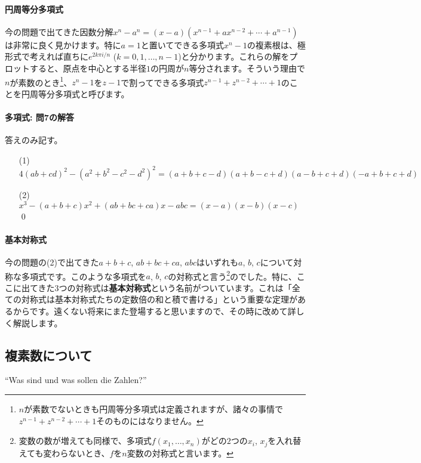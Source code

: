 \paragraph{円周等分多項式} 今の問題で出てきた因数分解$x^n-a^n=(x-a)(x^{n-1}+ax^{n-2}+\cdots+a^{n-1})$は非常に良く見かけます。特に$a=1$と置いてできる多項式$x^n-1$の複素根は、極形式で考えれば直ちに$e^{2k\pi i/n}$ ($k=0,1,\ldots,n-1$)と分かります。これらの解をプロットすると、原点を中心とする半径$1$の円周が$n$等分されます。そういう理由で$n$が素数のとき\footnote{$n$が素数でないときも円周等分多項式は定義されますが、諸々の事情で$z^{n-1}+z^{n-2}+\cdots+1$そのものにはなりません。}、$z^n-1$を$z-1$で割ってできる多項式$z^{n-1}+z^{n-2}+\cdots+1$のことを円周等分多項式と呼びます。

\paragraph{多項式: 問7の解答} 答えのみ記す。
\begin{itemize}
\item[(1)] %
$4(ab+cd)^2-(a^2+b^2-c^2-d^2)^2
= (a+b+c-d)(a+b-c+d)(a-b+c+d)(-a+b+c+d)$
\item[(2)] $x^3-(a+b+c)x^2+(ab+bc+ca)x-abc = (x-a)(x-b)(x-c)$ \qed
\end{itemize}

\paragraph{基本対称式}

今の問題の(2)で出てきた$a+b+c$, $ab+bc+ca$, $abc$はいずれも$a$, $b$, $c$について対称な多項式です。このような多項式を$a$, $b$, $c$の対称式と言う\footnote{変数の数が増えても同様で、多項式$f(x_1,\ldots,x_n)$がどの$2$つの$x_i$, $x_j$を入れ替えても変わらないとき、$f$を$n$変数の対称式と言います。}のでした。特に、ここに出てきた$3$つの対称式は\textbf{基本対称式}という名前がついています。これは「全ての対称式は基本対称式たちの定数倍の和と積で書ける」という重要な定理があるからです。遠くない将来にまた登場すると思いますので、その時に改めて詳しく解説します。

\subsection{複素数について}
\begin{citation}
{}``Was sind und was sollen die Zahlen?''
\end{citation}


